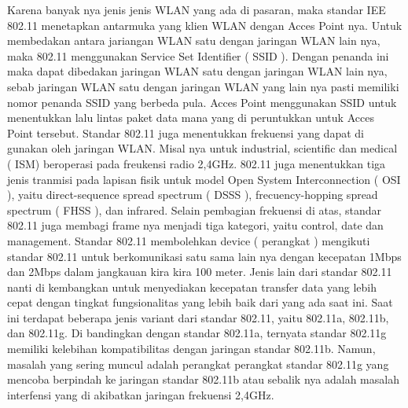 Karena banyak nya jenis jenis WLAN yang ada di pasaran, maka standar IEE 802.11
menetapkan antarmuka yang klien WLAN dengan Acces Point nya. Untuk membedakan
antara jariangan WLAN satu dengan jaringan WLAN lain nya, maka 802.11
menggunakan Service Set Identifier ( SSID ). Dengan penanda ini maka dapat dibedakan
jaringan WLAN satu dengan jaringan WLAN lain nya, sebab jaringan WLAN satu
dengan jaringan WLAN yang lain nya pasti memiliki nomor penanda SSID yang berbeda
pula. Acces Point menggunakan SSID untuk menentukkan lalu lintas paket data mana
yang di peruntukkan untuk Acces Point tersebut.
Standar 802.11 juga menentukkan frekuensi yang dapat di gunakan oleh jaringan WLAN.
Misal nya untuk industrial, scientific dan medical ( ISM) beroperasi pada freukensi radio
2,4GHz. 802.11 juga menentukkan tiga jenis tranmisi pada lapisan fisik untuk model
Open System Interconnection ( OSI ), yaitu direct-sequence spread spectrum ( DSSS ),
frecuency-hopping spread spectrum ( FHSS ), dan infrared. Selain pembagian frekuensi
di atas, standar 802.11 juga membagi frame nya menjadi tiga kategori, yaitu control, date
dan management.
Standar 802.11 membolehkan device ( perangkat ) mengikuti standar 802.11 untuk
berkomunikasi satu sama lain nya dengan kecepatan 1Mbps dan 2Mbps dalam jangkauan
kira kira 100 meter. Jenis lain dari standar 802.11 nanti di kembangkan untuk
menyediakan kecepatan transfer data yang lebih cepat dengan tingkat fungsionalitas yang
lebih baik dari yang ada saat ini. Saat ini terdapat beberapa jenis variant dari standar
802.11, yaitu 802.11a, 802.11b, dan 802.11g.
Di bandingkan dengan standar 802.11a, ternyata standar 802.11g memiliki kelebihan
kompatibilitas dengan jaringan standar 802.11b. Namun, masalah yang sering muncul
adalah perangkat perangkat standar 802.11g yang mencoba berpindah ke jaringan standar
802.11b atau sebalik nya adalah masalah interfensi yang di akibatkan jaringan frekuensi
2,4GHz.

